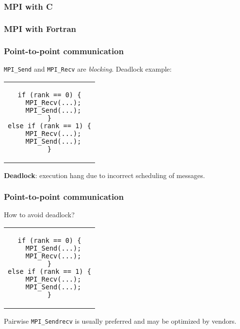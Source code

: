\begin{frame}[fragile]
  \frametitle{MPI with C}
  \scalebox{0.5}{
    
  }
\end{frame}

\begin{frame}[fragile]
  \frametitle{MPI with Fortran}
  \scalebox{0.5}{
    
  }
\end{frame}

\begin{frame}[fragile]
  \frametitle{Point-to-point communication}
  \texttt{MPI\_Send} and \texttt{MPI\_Recv} are \emph{blocking}. Deadlock
  example:
  \begin{center}
    \begin{tabular}{c}
\begin{lstlisting}[style=c,morekeywords={MPI_Recv,MPI_Send}]
if (rank == 0) {
  MPI_Recv(...);
  MPI_Send(...);
}
else if (rank == 1) {
  MPI_Recv(...);
  MPI_Send(...);
}
\end{lstlisting}
    \end{tabular}
  \end{center}

\textbf{Deadlock}: execution hang due to incorrect scheduling of messages.

\end{frame}

\begin{frame}[fragile]
  \frametitle{Point-to-point communication}
  How to avoid deadlock?
  \begin{center}
    \begin{tabular}{c}
\begin{lstlisting}[style=c,morekeywords={MPI_Recv,MPI_Send}]
if (rank == 0) {
  MPI_Send(...);
  MPI_Recv(...);
}
else if (rank == 1) {
  MPI_Recv(...);
  MPI_Send(...);
}
\end{lstlisting}
    \end{tabular}
  \end{center}

\medskip
Pairwise \texttt{MPI\_Sendrecv} is usually preferred and may be optimized by vendors.

\end{frame}

